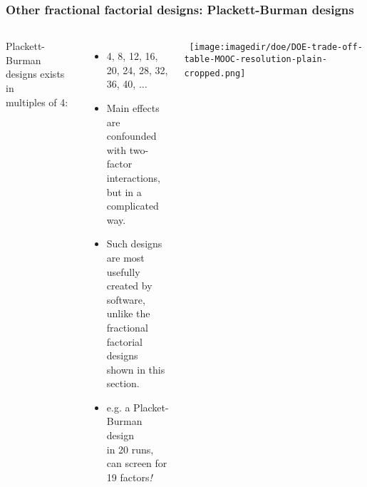 \documentclass[handout,11pt,aspectratio=169,mathserif]{beamer}
\begin{document}
\begin{frame}\frametitle{Other fractional factorial designs: Plackett-Burman designs}
 	\begin{columns}[T]
 		
			
			Plackett-Burman designs exists in \\
			multiples of 4:
			
				\begin{itemize}
					\item	4, 8, 12, 16, 20, 24, 28, 32, \\
							36, 40, $\ldots$
					
					\item	Main effects are confounded \\
							with two-factor interactions,\\
							but in a complicated way.
							
					\item	Such designs are most usefully \\
							created by software, unlike the\\
							fractional factorial designs \\
							shown in this section.
							
					\item	e.g. a Placket-Burman design\\
							in 20 runs, can screen for\\
							19 factors\emph{!}
							
				\end{itemize}
			\hbox{\hspace{-5.5em}
				\texttt{[image: \\imagedir/doe/DOE-trade-off-table-MOOC-resolution-plain-cropped.png]}
			}
					
 	\end{columns}
	 
	 
	
\end{frame}
\end{document}
